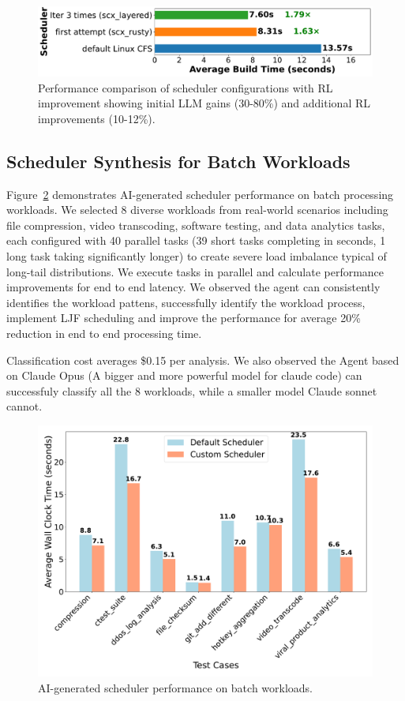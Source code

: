 \begin{figure}[h]
\centering
\includegraphics[width=0.9\columnwidth]{sections/Linux_build_benchmark_results.pdf}
\caption{Performance comparison of scheduler configurations with RL improvement showing initial LLM gains (30-80\%) and additional RL improvements (10-12\%).}
\label{fig:performance-comparison}
\end{figure}

\subsection{Scheduler Synthesis for Batch Workloads}

Figure~\ref{fig:batch-performance} demonstrates AI-generated scheduler performance on batch processing workloads. We selected 8 diverse workloads from real-world scenarios including file compression, video transcoding, software testing, and data analytics tasks, each configured with 40 parallel tasks (39 short tasks completing in seconds, 1 long task taking significantly longer) to create severe load imbalance typical of long-tail distributions. We execute tasks in parallel and calculate performance improvements for end to end latency. We observed the agent can consistently identifies the workload pattens, successfully identify the workload process, implement LJF scheduling and improve the performance for average 20\% reduction in end to end processing time.

Classification cost averages \$0.15 per analysis. We also observed the Agent based on Claude Opus (A bigger and more powerful model for claude code) can successfuly classify all the 8 workloads, while a smaller model Claude sonnet cannot.

\begin{figure}[h]
\centering
\includegraphics[width=0.9\columnwidth]{sections/scheduler_performance_comparison.pdf}
\caption{AI-generated scheduler performance on batch workloads.}
\label{fig:batch-performance}
\end{figure}

